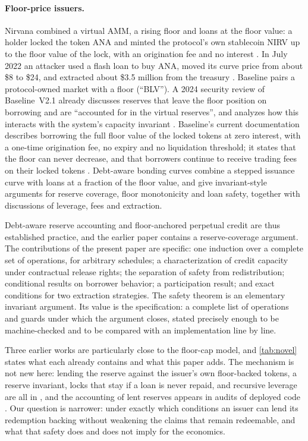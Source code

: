 \paragraph{Floor-price issuers.} Nirvana combined a virtual AMM, a rising floor and loans at the floor value: a holder locked the token ANA and minted the protocol's own stablecoin NIRV up to the floor value of the lock, with an origination fee and no interest \citep{nirvanadocs}. In July 2022 an attacker used a flash loan to buy ANA, moved its curve price from about \$8 to \$24, and extracted about \$3.5 million from the treasury \citep{certiknirvana}. Baseline pairs a protocol-owned market with a floor (``BLV''). A 2024 security review of Baseline~V2.1 already discusses reserves that leave the floor position on borrowing and are ``accounted for in the virtual reserves'', and analyzes how this interacts with the system's capacity invariant \citep{guardianbaseline}. Baseline's current documentation describes borrowing the full floor value of the locked tokens at zero interest, with a one-time origination fee, no expiry and no liquidation threshold; it states that the floor can never decrease, and that borrowers continue to receive trading fees on their locked tokens \citep{baselinedocs}. Debt-aware bonding curves \vone{} combine a stepped issuance curve with loans at a fraction of the floor value, and give invariant-style arguments for reserve coverage, floor monotonicity and loan safety, together with discussions of leverage, fees and extraction.

Debt-aware reserve accounting and floor-anchored perpetual credit are thus established practice, and the earlier paper contains a reserve-coverage argument. The contributions of the present paper are specific: one induction over a complete set of operations, for arbitrary schedules; a characterization of credit capacity under contractual release rights; the separation of safety from redistribution; conditional results on borrower behavior; a participation result; and exact conditions for two extraction strategies. The safety theorem is an elementary invariant argument. Its value is the specification: a complete list of operations and guards under which the argument closes, stated precisely enough to be machine-checked and to be compared with an implementation line by line.

Three earlier works are particularly close to the floor-cap model, and \cref{tab:novel} states what each already contains and what this paper adds. The mechanism is not new here: lending the reserve against the issuer's own floor-backed tokens, a reserve invariant, locks that stay if a loan is never repaid, and recursive leverage are all in \citet{dabc2026}, and the accounting of lent reserves appears in audits of deployed code \citep{guardianbaseline}. Our question is narrower: under exactly which conditions an issuer can lend its redemption backing without weakening the claims that remain redeemable, and what that safety does and does not imply for the economics.

